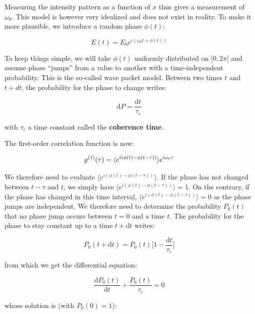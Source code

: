 \noindent Measuring the intensity pattern as a function of $x$ thus gives a measurement of $\omega_0$. This model is however very idealized and does not exist in reality. To make it more plausible, we introduce a random phase $\phi(t)$:

\begin{equation}
    E(t)=E_0 e^{i (\omega_0 t + \phi(t))}
\end{equation}

\noindent To keep things simple, we will take $\phi(t)$ uniformly distributed on $[0,2\pi[$ and assume phase ``jumps'' from a value to another with a time-independent probability. This is the so-called wave packet model. Between two times $t$ and $t+dt$, the probability for the phase to change writes:

\begin{equation}
    \mathrm{d}P = \frac{\mathrm{d}t}{\tau_c}
\end{equation}

\noindent with $\tau_c$ a time constant called the \textbf{coherence time}.

The first-order correlation function is now:

\begin{equation}
    g^{(1)} (\tau) = \langle e^{i(\phi(t)-\phi(t-\tau))}\rangle e^{i \omega_0 \tau}
\end{equation}

\noindent We therefore need to evaluate $\langle e^{i(\phi(t)-\phi(t-\tau))} \rangle$. If the phase has not changed between $t-\tau$ and $t$, we simply have $\langle e^{i(\phi(t)-\phi(t-\tau))} \rangle=1$. On the contrary, if the phase has changed in this time interval, $\langle e^{i(\phi(t)-\phi(t-\tau))} \rangle=0$ as the phase jumps are independent. We therefore need to determine the probability $P_0(t)$ that no phase jump occurs between $t=0$ and a time $t$. The probability for the phase to stay constant up to a time $t+ \mathrm{d}t$ writes:


\begin{equation}
    P_0(t+\mathrm{d}t)=P_0(t)  \Bigg[1-\frac{\mathrm{d}t}{\tau_c} \Bigg]
\end{equation}

\noindent from which we get the differential equation:

\begin{equation}
    \frac{\mathrm{d}P_0(t)}{\mathrm{d}t} + \frac{P_0(t)}{\tau_c} = 0
\end{equation}

\noindent whose solution is (with $P_0(0)=1$):

